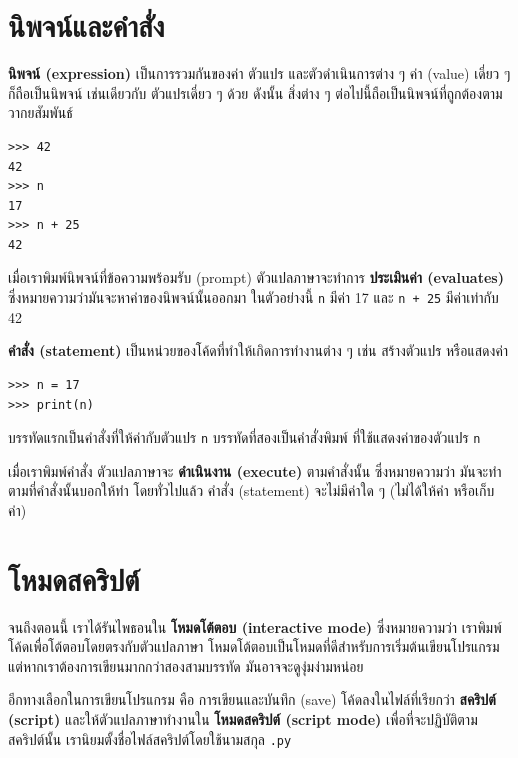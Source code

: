 \section{นิพจน์และคำสั่ง} %

{\bf นิพจน์ (expression)} เป็นการรวมกันของค่า ตัวแปร และตัวดำเนินการต่าง ๆ
ค่า (value) เดี่ยว ๆ ก็ถือเป็นนิพจน์ เช่นเดียวกับ ตัวแปรเดี่ยว ๆ ด้วย
ดังนั้น สิ่งต่าง ๆ ต่อไปนี้ถือเป็นนิพจน์ที่ถูกต้องตามวากยสัมพันธ์

\begin{verbatim}
>>> 42
42
>>> n
17
>>> n + 25
42
\end{verbatim}
%
เมื่อเราพิมพ์นิพจน์ที่ข้อความพร้อมรับ (prompt) ตัวแปลภาษาจะทำการ {\bf ประเมินค่า (evaluates)}  
ซึ่งหมายความว่ามันจะหาค่าของนิพจน์นั้นออกมา ในตัวอย่างนี้ {\tt n} มีค่า 17
และ {\tt n + 25} มีค่าเท่ากับ 42

{\bf คำสั่ง (statement)} เป็นหน่วยของโค้ดที่ทำให้เกิดการทำงานต่าง ๆ เช่น สร้างตัวแปร หรือแสดงค่า

\begin{verbatim}
>>> n = 17
>>> print(n)
\end{verbatim}
%
บรรทัดแรกเป็นคำสั่งที่ให้ค่ากับตัวแปร {\tt n}
บรรทัดที่สองเป็นคำสั่งพิมพ์ ที่ใช้แสดงค่าของตัวแปร {\tt n}

เมื่อเราพิมพ์คำสั่ง ตัวแปลภาษาจะ {\bf ดำเนินงาน (execute)} ตามคำสั่งนั้น ซึ่งหมายความว่า
มันจะทำตามที่คำสั่งนั้นบอกให้ทำ  โดยทั่วไปแล้ว คำสั่ง (statement) จะไม่มีค่าใด ๆ 
(ไม่ได้ให้ค่า หรือเก็บค่า)


\section{โหมดสคริปต์} %

จนถึงตอนนี้ เราได้รันไพธอนใน {\bf โหมดโต้ตอบ (interactive mode)} ซึ่งหมายความว่า 
เราพิมพ์โค้ดเพื่อโต้ตอบโดยตรงกับตัวแปลภาษา โหมดโต้ตอบเป็นโหมดที่ดีสำหรับการเริ่มต้นเขียนโปรแกรม
แต่หากเราต้องการเขียนมากกว่าสองสามบรรทัด มันอาจจะดูงุ่มง่ามหน่อย

อีกทางเลือกในการเขียนโปรแกรม คือ การเขียนและบันทึก (save) โค้ดลงในไฟล์ที่เรียกว่า 
{\bf สคริปต์ (script)} และให้ตัวแปลภาษาทำงานใน {\bf โหมดสคริปต์ (script mode)} 
เพื่อที่จะปฏิบัติตามสคริปต์นั้น เรานิยมตั้งชื่อไฟล์สคริปต์โดยใช้นามสกุล {\tt .py}  


